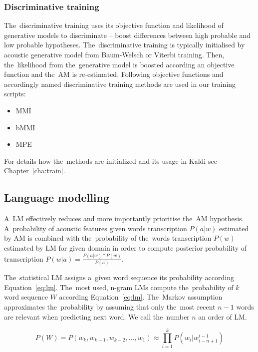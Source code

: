 \subsubsection*{Discriminative training}
\label{sub:subsection_name}
The~discriminative training uses its objective function and likelihood of generative models to discriminate -- boost differences between high probable and low probable hypotheses.
The~discriminative training is typically initialised by acoustic generative model from Baum-Welsch or Viterbi training.
Then, the~likelihood from the~generative model is boosted according an objective function and the~\ac{AM} is re-estimated.
Following objective functions and accordingly named discriminative training methods are used in our training scripts:
\begin{itemize}
    \item \acl{MMI}\cite{chow1990maximum} 
    \item \acl{bMMI}\cite{povey2008boosted}
    \item \acl{MPE}\cite{povey2003mmi}
\end{itemize}
For details how the~methods are initialized and its usage in Kaldi see Chapter~\ref{cha:train}.

\subsection{Language modelling}
\label{sub:lm}

A~\acl{LM} effectively reduces and more importantly prioritise the~\ac{AM} hypothesis.
A~probability of acoustic features given words transcription $P(a|w)$ estimated by \ac{AM} is combined with the~probability of the~words transcription $P(w)$ estimated by \ac{LM} for given domain in order to compute posterior probability of transcription $P(w|a) = \frac{P(a|w)*P(w)}{P(a)}$.

The~statistical \ac{LM} assigns a~given word sequence its probability according Equation~\ref{eq:lm}.
The~most used, n-gram \acp{LM} compute the~probability of $k$ word sequence $W$ according Equation~\ref{eq:lm}.\cite{brants2007large}
The~Markov assumption approximates the~probability by assuming that only the~most recent $n-1$ words are relevant when predicting next word.
We call the~number $n$ an order of \ac{LM}.

\begin{equation} \label{eq:lm}
    P(W)=P(w_k,  w_{k-1}, w_{k-2}, ..., w_1) \approx \prod_{i=1}^{k}{P(w_i|w^{i-1}_{i-n+1})}
\end{equation}

